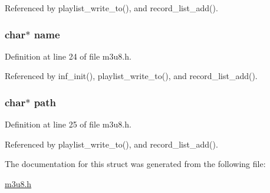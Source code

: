 \-Referenced by playlist\-\_\-write\-\_\-to(), and record\-\_\-list\-\_\-add().

\hypertarget{struct_inf_record_a5ac083a645d964373f022d03df4849c8}{
\subsubsection[{name}]{\setlength{\rightskip}{0pt plus 5cm}char$\ast$ {\bf name}}}\label{struct_inf_record_a5ac083a645d964373f022d03df4849c8}


\-Definition at line 24 of file m3u8.\-h.



\-Referenced by inf\-\_\-init(), playlist\-\_\-write\-\_\-to(), and record\-\_\-list\-\_\-add().

\hypertarget{struct_inf_record_a44196e6a5696d10442c29e639437196e}{
\subsubsection[{path}]{\setlength{\rightskip}{0pt plus 5cm}char$\ast$ {\bf path}}}\label{struct_inf_record_a44196e6a5696d10442c29e639437196e}


\-Definition at line 25 of file m3u8.\-h.



\-Referenced by playlist\-\_\-write\-\_\-to(), and record\-\_\-list\-\_\-add().



\-The documentation for this struct was generated from the following file\-:\begin{DoxyCompactItemize}
\item 
\hyperlink{m3u8_8h}{m3u8.\-h}\end{DoxyCompactItemize}
